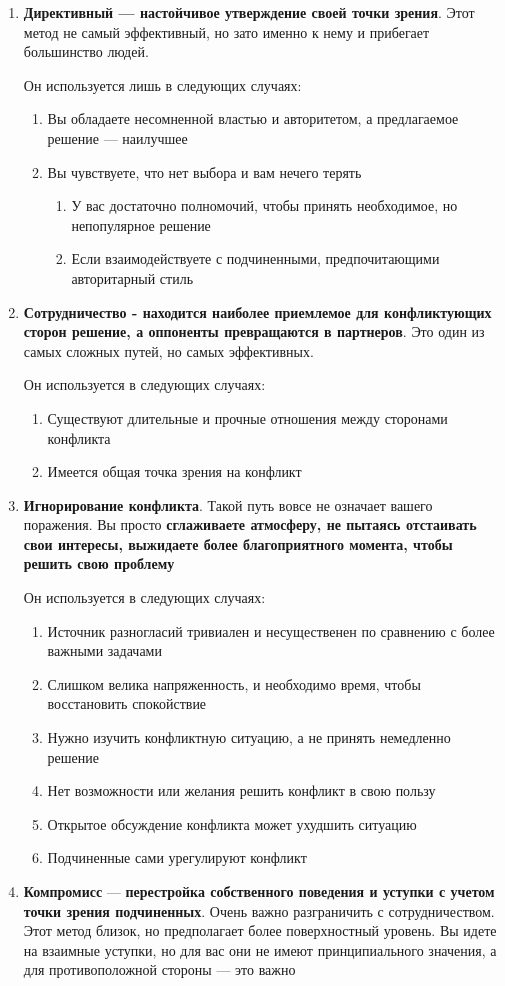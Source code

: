 \documentclass[a4paper,14pt]{extarticle}
\begin{document}
\begin{enumerate}
    \item \textbf{Директивный — настойчивое утверждение своей точки зрения}. Этот метод не самый эффективный, но зато именно к нему и прибегает большинство людей.

    Он используется лишь в следующих случаях:
    \begin{enumerate}
        \item Вы обладаете несомненной властью и авторитетом, а предлагаемое решение — наилучшее
        \item Вы чувствуете, что нет выбора и вам нечего терять
        \begin{enumerate}
            \item У вас достаточно полномочий, чтобы принять необходимое, но непопулярное решение
            \item Если взаимодействуете с подчиненными, предпочитающими авторитарный стиль
        \end{enumerate}
    \end{enumerate}
    \item \textbf{Сотрудничество - находится наиболее приемлемое для конфликтующих сторон решение, а оппоненты превращаются в партнеров}. Это один из самых сложных путей, но самых эффективных.

    Он используется в следующих случаях:
    \begin{enumerate}
        \item Существуют длительные и прочные отношения между сторонами конфликта
        \item Имеется общая точка зрения на конфликт
    \end{enumerate}
    \item \textbf{Игнорирование конфликта}. Такой путь вовсе не означает вашего поражения. Вы просто \textbf{сглаживаете атмосферу, не пытаясь отстаивать свои интересы, выжидаете более благоприятного момента, чтобы решить свою проблему}

    Он используется в следующих случаях:
    \begin{enumerate}
        \item Источник разногласий тривиален и несущественен по сравнению с более важными задачами
        \item Слишком велика напряженность, и необходимо время, чтобы восстановить спокойствие
        \item Нужно изучить конфликтную ситуацию, а не принять немедленно решение
        \item Нет возможности или желания решить конфликт в свою пользу
        \item Открытое обсуждение конфликта может ухудшить ситуацию
        \item Подчиненные сами урегулируют конфликт
    \end{enumerate}
    \item \textbf{Компромисс} — \textbf{перестройка собственного поведения и уступки с учетом точки зрения подчиненных}. Очень важно разграничить с сотрудничеством. Этот метод близок, но предполагает более поверхностный уровень. Вы идете на взаимные уступки, но для вас они не имеют принципиального значения, а для противоположной стороны — это важно


\end{enumerate}
\end{document}

